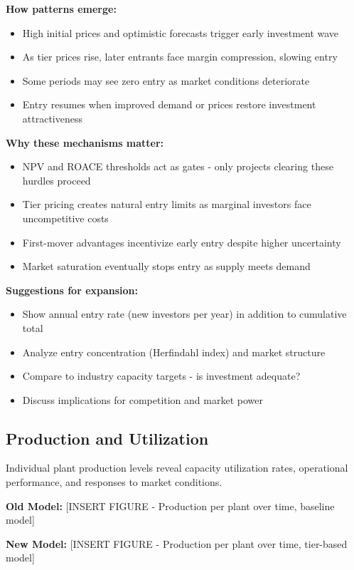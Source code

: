 \documentclass[10.5pt]{article}
\begin{document}
\textbf{How patterns emerge:}
\begin{itemize}
    \item High initial prices and optimistic forecasts trigger early investment wave
    \item As tier prices rise, later entrants face margin compression, slowing entry
    \item Some periods may see zero entry as market conditions deteriorate
    \item Entry resumes when improved demand or prices restore investment attractiveness
\end{itemize}

\textbf{Why these mechanisms matter:}
\begin{itemize}
    \item NPV and ROACE thresholds act as gates - only projects clearing these hurdles proceed
    \item Tier pricing creates natural entry limits as marginal investors face uncompetitive costs
    \item First-mover advantages incentivize early entry despite higher uncertainty
    \item Market saturation eventually stops entry as supply meets demand
\end{itemize}

\textbf{Suggestions for expansion:}
\begin{itemize}
    \item Show annual entry rate (new investors per year) in addition to cumulative total
    \item Analyze entry concentration (Herfindahl index) and market structure
    \item Compare to industry capacity targets - is investment adequate?
    \item Discuss implications for competition and market power
\end{itemize}

\subsection{Production and Utilization}

Individual plant production levels reveal capacity utilization rates, operational performance, and responses to market conditions.

\textbf{Old Model:} [INSERT FIGURE - Production per plant over time, baseline model]

\textbf{New Model:} [INSERT FIGURE - Production per plant over time, tier-based model]
\end{document}
